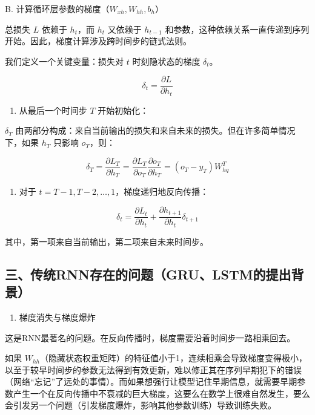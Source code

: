 B. 计算循环层参数的梯度（\(W_{xh}, W_{hh}, b_h\)）

总损失 \(L\) 依赖于 \(h_t\)，而 \(h_t\) 又依赖于 \(h_{t-1}\) 和参数，这种依赖关系一直传递到序列开始。因此，梯度计算涉及跨时间步的链式法则。

我们定义一个关键变量：损失对 \(t\) 时刻隐状态的梯度 \(\delta_t\)。

\[
\delta_t = \frac{\partial L}{\partial h_t}
\]

\begin{enumerate}
\def\labelenumi{\arabic{enumi}.}
\tightlist
\item
  从最后一个时间步 \(T\) 开始初始化：
\end{enumerate}

\(\delta_T\) 由两部分构成：来自当前输出的损失和来自未来的损失。但在许多简单情况下，如果 \(h_T\) 只影响 \(o_T\)，则：

\[
\delta_T = \frac{\partial L_T}{\partial h_T}
= \frac{\partial L_T}{\partial o_T}\frac{\partial o_T}{\partial h_T}
= (o_T - y_T) W_{hq}^T
\]

\begin{enumerate}
\def\labelenumi{\arabic{enumi}.}
\setcounter{enumi}{1}
\tightlist
\item
  对于 \(t = T-1, T-2, \ldots, 1\)，梯度递归地反向传播：
\end{enumerate}

\[
\delta_t = \frac{\partial L_t}{\partial h_t} + \frac{\partial h_{t+1}}{\partial h_t}\delta_{t+1}
\]

其中，第一项来自当前输出，第二项来自未来时间步。

\hypertarget{ux4e09ux4f20ux7edfrnnux5b58ux5728ux7684ux95eeux9898grulstmux7684ux63d0ux51faux80ccux666f}{%
\subsection{三、传统RNN存在的问题（GRU、LSTM的提出背景）}\label{ux4e09ux4f20ux7edfrnnux5b58ux5728ux7684ux95eeux9898grulstmux7684ux63d0ux51faux80ccux666f}}

\begin{enumerate}
\def\labelenumi{\arabic{enumi}.}
\tightlist
\item
  梯度消失与梯度爆炸
\end{enumerate}

这是RNN最著名的问题。在反向传播时，梯度需要沿着时间步一路相乘回去。

如果 \(W_{hh}\)（隐藏状态权重矩阵）的特征值小于1，连续相乘会导致梯度变得极小，以至于较早时间步的参数无法得到有效更新，难以修正其在序列早期犯下的错误（网络``忘记''了远处的事情）。而如果想强行让模型记住早期信息，就需要早期参数产生一个在反向传播中不衰减的巨大梯度，这要么在数学上很难自然发生，要么会引发另一个问题（引发梯度爆炸，影响其他参数训练）导致训练失败。

